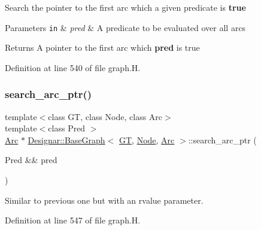 Search the pointer to the first arc which a given predicate is {\bfseries true} 


\begin{DoxyParams}[1]{Parameters}
\mbox{\tt in}  & {\em pred} & A predicate to be evaluated over all arcs \\
\hline
\end{DoxyParams}
\begin{DoxyReturn}{Returns}
A pointer to the first arc which {\bfseries pred} is true 
\end{DoxyReturn}


Definition at line 540 of file graph.\+H.

\mbox{\label{class_designar_1_1_base_graph_a6d7036b2c4b78dcc46de3fc0d314b871}} 
\subsubsection{\texorpdfstring{search\+\_\+arc\+\_\+ptr()}{search\_arc\_ptr()}\hspace{0.1cm}{\footnotesize\ttfamily [2/2]}}
{\footnotesize\ttfamily template$<$class GT, class Node, class Arc$>$ \\
template$<$class Pred $>$ \\
\hyperlink{namespace_designar_a3f55fb5513d62ff47cbc8f72b8e95d6f}{Arc} $\ast$ \hyperlink{class_designar_1_1_base_graph}{Designar\+::\+Base\+Graph}$<$ \hyperlink{demo-buildgraph_8_c_a3001c40d2c31ca87ed96cd7d1334a55e}{GT}, \hyperlink{namespace_designar_a5af326c65aa2bd26b26c410f2030d09e}{Node}, \hyperlink{namespace_designar_a3f55fb5513d62ff47cbc8f72b8e95d6f}{Arc} $>$\+::search\+\_\+arc\+\_\+ptr (\begin{DoxyParamCaption}\item[{Pred \&\&}]{pred }\end{DoxyParamCaption})\hspace{0.3cm}{\ttfamily [inline]}}



Similar to previous one but with an rvalue parameter. 



Definition at line 547 of file graph.\+H.

\mbox{\label{class_designar_1_1_base_graph_aa15b13f58a4961b1593045d1e228adec}} 
